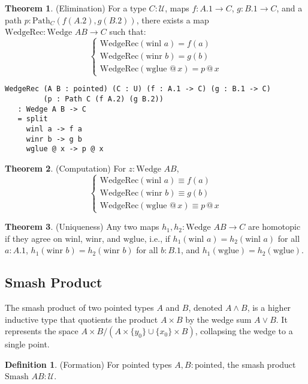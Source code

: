 \documentclass{article}
\theoremstyle{definition}
\newtheorem{theorem}{Theorem}
\newtheorem{definition}{Definition}
\begin{document}
\begin{theorem} (Elimination)
For a type $C : \mathcal{U}$, maps $f : A.1 \to C$, $g : B.1 \to C$, and a path $p : \text{Path}_C (f (A.2), g (B.2))$, there exists a map $\text{WedgeRec} : \text{Wedge } A B \to C$ such that:
\[
\begin{cases}
\text{WedgeRec}(\text{winl } a) = f(a) \\
\text{WedgeRec}(\text{winr } b) = g(b) \\
\text{WedgeRec}(\text{wglue } @ \, x) = p \, @ \, x
\end{cases}
\]
\begin{lstlisting}
WedgeRec (A B : pointed) (C : U) (f : A.1 -> C) (g : B.1 -> C)
         (p : Path C (f A.2) (g B.2))
   : Wedge A B -> C
   = split
     winl a -> f a
     winr b -> g b
     wglue @ x -> p @ x
\end{lstlisting}
\end{theorem}

\begin{theorem} (Computation)
For $z : \text{Wedge } A B$,
\[
\begin{cases}
\text{WedgeRec}(\text{winl } a) \equiv f(a) \\
\text{WedgeRec}(\text{winr } b) \equiv g(b) \\
\text{WedgeRec}(\text{wglue } @ \, x) \equiv p \, @ \, x
\end{cases}
\]
\end{theorem}

\begin{theorem} (Uniqueness)
Any two maps $h_1, h_2 : \text{Wedge } A B \to C$ are homotopic if they agree on $\text{winl}$, $\text{winr}$, and $\text{wglue}$, i.e., if $h_1(\text{winl } a) = h_2(\text{winl } a)$ for all $a : A.1$, $h_1(\text{winr } b) = h_2(\text{winr } b)$ for all $b : B.1$, and $h_1(\text{wglue}) = h_2(\text{wglue})$.
\end{theorem}

\newpage
\subsection{Smash Product}
The smash product of two pointed types $A$ and $B$, denoted $A \wedge B$, is a higher inductive type that quotients the product $A \times B$ by the wedge sum $A \vee B$. It represents the space $A \times B / (A \times \{ y_0 \} \cup \{ x_0 \} \times B)$, collapsing the wedge to a single point.

\begin{definition} (Formation)
For pointed types $A, B : \text{pointed}$, the smash product $\text{Smash } A B : \mathcal{U}$.
\end{definition}
\end{document}
